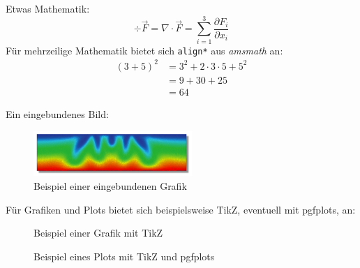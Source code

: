 \documentclass[german]{uebung}
\begin{document}
\begin{exercise}{2}
Etwas Mathematik:
$$\div  \vec{F} = \nabla \cdot \vec{F} = \sum_{i=1}^{3} \frac{\partial F_i}{\partial x_i}$$
Für mehrzeilige Mathematik bietet sich \verb|align*| aus \emph{amsmath} an:
\begin{align*}
(3+5)^2 &= 3^2+2\cdot 3 \cdot 5 + 5^2\\
&= 9 + 30 + 25\\
&= 64
\end{align*}
\end{exercise}

\begin{exercise}{3}
Ein eingebundenes Bild:
\begin{figure}[h]
	\centering
\includegraphics[width=6cm]{image}
	\caption{Beispiel einer eingebundenen Grafik}
\label{fig:grafik}
\end{figure}
\end{exercise}

\begin{exercise}{4}
	Für Grafiken und Plots bietet sich beispielsweise TikZ, eventuell mit pgfplots, an:
	\begin{figure}[h]
		\centering
		\caption{Beispiel einer Grafik mit TikZ}
		\label{fig:grafik}
	\end{figure}
	\begin{figure}[h]
		\centering
		\caption{Beispiel eines Plots mit TikZ und pgfplots}
		\label{fig:grafik}
	\end{figure}
\end{exercise}
\end{document}
